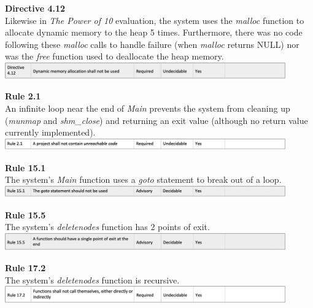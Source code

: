 \documentclass[a4paper]{article}
\begin{document}
\newpage
\par \noindent \textbf{Directive 4.12} \\[1\baselineskip]
Likewise in \emph{The Power of 10} evaluation, the system uses the \emph{malloc} function to allocate dynamic memory to the heap 5 times. Furthermore, there was no code following these \emph{malloc} calls to handle failure (when \emph{malloc} returns NULL) nor was the \emph{free} function used to deallocate the heap memory. \\[1\baselineskip]
\includegraphics[width=12.12cm]{report-img/misra-c-3.png}

\par \noindent \textbf{Rule 2.1} \\[1\baselineskip]
An infinite loop near the end of \emph{Main} prevents the system from cleaning up (\emph{munmap} and \emph{shm\_close}) and returning an exit value (although no return value currently implemented). \\[1\baselineskip]
\includegraphics[width=12.12cm]{report-img/misra-c-4.png}

\par \noindent \textbf{Rule 15.1} \\[1\baselineskip]
The system’s \emph{Main} function uses a \emph{goto} statement to break out of a loop. \\[1\baselineskip]
\includegraphics[width=12.12cm]{report-img/misra-c-5.png}

\par \noindent \textbf{Rule 15.5} \\[1\baselineskip]
The system’s \emph{deletenodes} function has 2 points of exit. \\[1\baselineskip]
\includegraphics[width=12.12cm]{report-img/misra-c-6.png}

\par \noindent \textbf{Rule 17.2} \\[1\baselineskip]
The system’s \emph{deletenodes} function is recursive. \\[1\baselineskip]
\includegraphics[width=12.12cm]{report-img/misra-c-7.png}
\end{document}
